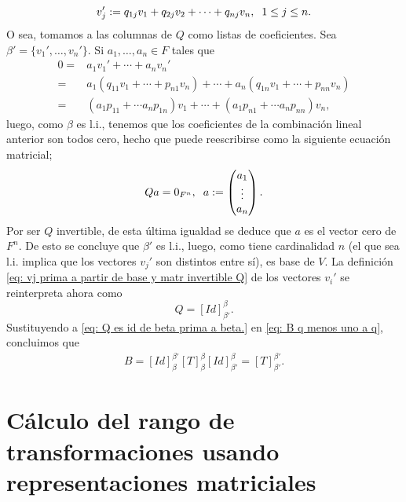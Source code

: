 \begin{equation}
	\label{eq: vj prima a partir de base y matr invertible Q}
	v_{j}' := q_{1j} v_{1} + q_{2j}v_{2} + \cdots + q_{nj} v_{n}, 
	\hspace{0.2cm} 1 \leq j \leq n.
\end{equation}
O sea, tomamos a las columnas de $Q$ como listas de coeficientes.
Sea $\beta' = \{v_{1}', \ldots , v_{n}' \}$.
Si $a_{1}, \ldots , a_{n} \in F$ tales que 
\begin{align*}
	0 = & a_{1}v_{1}' + \cdots + a_{n}v_{n}' \\
	= & a_{1}(q_{11}v_{1} + \cdots + p_{n1}v_{n}) + \cdots +
	a_{n}(q_{1n}v_{1} + \cdots + p_{nn}v_{n}) \\
	= & (a_{1}p_{11} + \cdots a_{n}p_{1n}) v_{1} + \cdots +
	(a_{1}p_{n1} + \cdots a_{n}p_{nn}) v_{n},
\end{align*}
luego, como $\beta$ es l.i., tenemos que los coeficientes de
la combinación lineal anterior son todos cero, hecho que puede
reescribirse como la siguiente ecuación matricial;
\[
Q a = 0_{F^{n}}, \hspace{0.2cm}
a := \begin{pmatrix}
	a_{1} \\
	\vdots \\
	a_{n}
\end{pmatrix}.
\]
Por ser $Q$ invertible, de esta última igualdad se deduce que 
$a$ es el vector cero de $F^{n}$. De esto se concluye que 
$\beta'$ es l.i., luego, como tiene cardinalidad $n$
(el que sea l.i. implica que los vectores $v_{j}'$ son 
distintos entre sí), es base de $V$. La definición 
\eqref{eq: vj prima a partir de base y matr invertible Q} de 
los vectores $v_{i}'$ se reinterpreta ahora como
\begin{equation}
	\label{eq: Q es id de beta prima a beta.}
	Q = [Id]_{\beta'}^{\beta}.
\end{equation}
Sustituyendo a \eqref{eq: Q es id de beta prima a beta.} en 
\eqref{eq: B q menos uno a q}, concluimos que 
\begin{align*}
	B = [Id]_{\beta}^{\beta'} [T]_{\beta}^{\beta} [Id]_{\beta'}^{\beta}
	= [T]_{\beta'}^{\beta'}.
\end{align*}

\QEDB
\vspace{0.2cm}


\section{Cálculo del rango de transformaciones usando representaciones matriciales}

